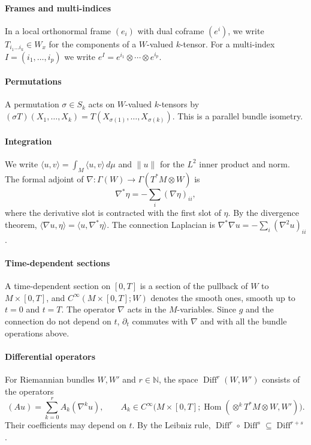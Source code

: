 \documentclass[11pt,reqno]{amsart}
\theoremstyle{definition}
\theoremstyle{remark}
\newcommand{\N}{\mathbb{N}}
\newcommand{\Diff}{\operatorname{Diff}}
\newcommand{\Hom}{\operatorname{Hom}}
\newcommand{\dmu}{\,d\mu}
\newcommand{\ip}[2]{\langle #1,#2\rangle}
\newcommand{\norm}[1]{\lVert #1\rVert}
\newcommand{\Lap}{\nabla^{*}\nabla}
\numberwithin{equation}{section}
\begin{document}
\paragraph{Frames and multi-indices} In a local orthonormal frame $(e_i)$ with dual coframe $(e^i)$, we
write $T_{i_1\dots i_k}\in W_x$ for the components of a $W$-valued $k$-tensor. For a multi-index
$I=(i_1,\dots,i_p)$ we write $e^I=e^{i_1}\otimes\cdots\otimes e^{i_p}$.

\paragraph{Permutations} A permutation $\sigma\in S_k$ acts on $W$-valued $k$-tensors by
$(\sigma T)(X_1,\dots,X_k)=T(X_{\sigma(1)},\dots,X_{\sigma(k)})$. This is a parallel bundle isometry.

\paragraph{Integration} We write $\ip{u}{v}=\int_M\ip{u}{v}\dmu$ and $\norm{u}$ for the $L^2$ inner
product and norm. The formal adjoint of $\nabla\colon\Gamma(W)\to\Gamma(T^*M\otimes W)$ is
\[
  \nabla^*\eta=-\sum_i(\nabla\eta)_{ii},
\]
where the derivative slot is contracted with the first slot of $\eta$. By the divergence theorem,
$\ip{\nabla u}{\eta}=\ip{u}{\nabla^*\eta}$. The connection Laplacian is
$\Lap u=-\sum_i(\nabla^2u)_{ii}$.

\paragraph{Time-dependent sections} A time-dependent section on $[0,T]$ is a section of the pullback
of $W$ to $M\times[0,T]$, and $C^\infty(M\times[0,T];W)$ denotes the smooth ones, smooth up to $t=0$
and $t=T$. The operator $\nabla$ acts in the $M$-variables. Since $g$ and the connection do not depend
on $t$, $\partial_t$ commutes with $\nabla$ and with all the bundle operations above.

\paragraph{Differential operators} For Riemannian bundles $W,W'$ and $r\in\N$, the space
$\Diff^r(W,W')$ consists of the operators
\[
  (Au)=\sum_{k=0}^{r}A_k(\nabla^k u),\qquad
  A_k\in C^\infty\bigl(M\times[0,T];\Hom(\otimes^kT^*M\otimes W,W')\bigr).
\]
Their coefficients may depend on $t$. By the Leibniz rule,
$\Diff^r\circ\Diff^s\subseteq\Diff^{r+s}$.
\end{document}
